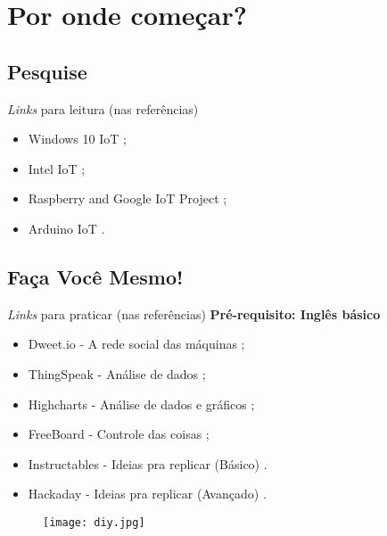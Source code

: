 \section{Por onde começar?}
\label{sec:comeco}

\subsection*{Pesquise}
\begin{frame}{}
	\begin{block}{\textit{Links} para leitura (nas referências)}
		\begin{itemize}
			\item Windows 10 IoT \cite{WindowsIot};
			\item Intel IoT \cite{IntelIot};
			\item Raspberry and Google IoT Project \cite{RaspberryGoogleIot};
			\item Arduino IoT \cite{ArduinoIot}.		
		\end{itemize}
	\end{block}
\end{frame}

\subsection*{Faça Você Mesmo!}
\begin{frame}{}
	\begin{block}{\textit{Links} para praticar (nas referências)}
		\textbf{Pré-requisito: Inglês básico}
		\begin{itemize}
			\item Dweet.io - A rede social das máquinas \cite{DweetIot};
			\item ThingSpeak - Análise de dados \cite{ThingSpeakIot};
			\item Highcharts - Análise de dados e gráficos \cite{HighChartsIot};
			\item FreeBoard - Controle das coisas \cite{FreeBoardIot};
			\item Instructables - Ideias pra replicar (Básico) \cite{InstructablesIot}. 
			\item Hackaday - Ideias pra replicar (Avançado) \cite{InstructablesIot}.
		\end{itemize}
	\end{block}
	\begin{figure}[H]
		\texttt{[image: diy.jpg]}\footnotemark
	\end{figure}
	
\end{frame}